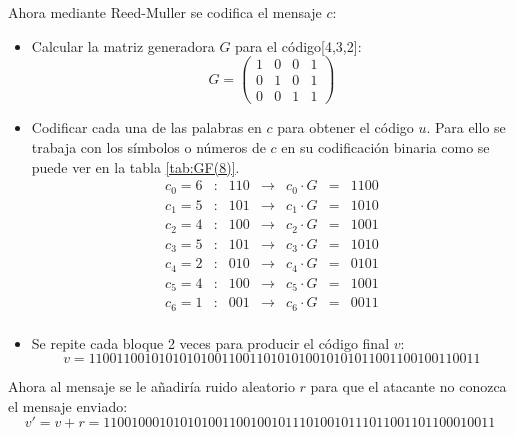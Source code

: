 Ahora mediante Reed-Muller se codifica el mensaje \(c\):
\begin{itemize}
	\item Calcular la matriz generadora \(G\) para el código[4,3,2]:
	\begin{equation}
		G=\begin{pmatrix}
			1&0&0&1\\
			0&1&0&1\\
			0&0&1&1
		\end{pmatrix}
	\end{equation}
	\item Codificar cada una de las palabras en \(c\) para obtener el código \(u\). Para ello se trabaja con los símbolos o números de \(c\) en su codificación binaria como se puede ver en la tabla \ref{tab:GF(8)}.
	\begin{equation}
		\begin{array}{ccccccc}
			c_0=6&:&110&\rightarrow &  c_0 \cdot G&=&1100\\
			c_1=5&:&101&\rightarrow & c_1 \cdot G&=&1010\\
			c_2=4&:&100&\rightarrow & c_2 \cdot G&=&1001\\
			c_3=5&:&101&\rightarrow & c_3 \cdot G&=&1010\\
			c_4=2&:&010&\rightarrow & c_4 \cdot G&=&0101\\
			c_5=4&:&100&\rightarrow & c_5 \cdot G&=&1001\\
			c_6=1&:&001&\rightarrow & c_6 \cdot G&=&0011\\
		\end{array}
	\end{equation}
	\item Se repite cada bloque 2 veces para producir el código final \(v\):
	\begin{equation}
		v=11001100101010101001100110101010010101011001100100110011
	\end{equation}
\end{itemize}

Ahora al mensaje se le añadiría ruido aleatorio \(r\) para que el atacante no conozca el mensaje enviado:
\begin{equation}
	v'=v+r=11001000101010100110010010111010010111011001101100010011
\end{equation}

